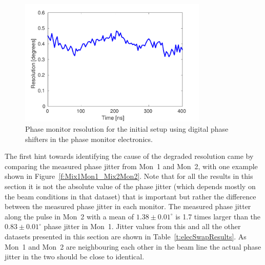 \begin{figure}
  \centering
  \includegraphics[width=0.8\textwidth]{Figures/phaseMons/resolutionDigShift}
  \caption{Phase monitor resolution for the initial setup using digital phase shifters in the phase monitor electronics.}
  \label{f:resolutionDigShift}
\end{figure}

The first hint towards identifying the cause of the degraded resolution came by comparing the measured phase jitter from Mon~1 and Mon~2, with one example shown in Figure~\ref{f:Mix1Mon1_Mix2Mon2}. Note that for all the results in this section it is not the absolute value of the phase jitter (which depends mostly on the beam conditions in that dataset) that is important but rather the difference between the measured phase jitter in each monitor. The measured phase jitter along the pulse in Mon~2 with a mean of \(1.38\pm0.01^\circ\) is 1.7 times larger than the \(0.83\pm0.01^\circ\) phase jitter in Mon~1. Jitter values from this and all the other datasets presented in this section are shown in Table~\ref{t:elecSwapResults}. As Mon~1 and Mon~2 are neighbouring each other in the beam line the actual phase jitter in the two should be close to identical.

